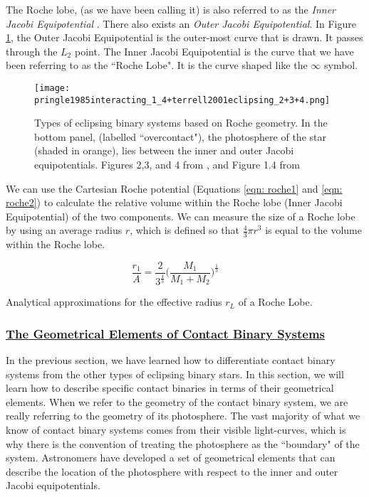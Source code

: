 \documentclass[12pt]{article} %
\numberwithin{equation}{section} %
\begin{document}
The Roche lobe, (as we have been calling it) is also referred to as the \emph{Inner Jacobi Equipotential} . There also exists an \emph{Outer Jacobi Equipotential}. In Figure \ref{fig: pringle1985interacting_1_4+terrell2001eclipsing_2+3+4}, the Outer Jacobi Equipotential is the outer-most curve that is drawn. It passes through the $L_{2}$ point. The Inner Jacobi Equipotential is the curve that we have been referring to as the ``Roche Lobe". It is the curve shaped like the $\infty$ symbol.

\begin{figure}[H]
\centering
\texttt{[image: pringle1985interacting\_1\_4+terrell2001eclipsing\_2+3+4.png]}
\caption{Types of eclipsing binary systems based on Roche geometry. In the bottom panel, (labelled ``overcontact"), the photosphere of the star (shaded in orange), lies between the inner and outer Jacobi equipotentials. Figures 2,3, and 4 from \citet{terrell2001eclipsing}, and Figure 1.4 from \citet{pringle1985interacting}}
\label{fig: pringle1985interacting_1_4+terrell2001eclipsing_2+3+4}
\end{figure}

We can use the Cartesian Roche potential (Equations \ref{eqn: roche1} and \ref{eqn: roche2}) to calculate the relative volume within the Roche lobe (Inner Jacobi Equipotential) of the two components. We can measure the size of a Roche lobe by using an average radius $r$, which is defined so that $\frac{4}{3} \pi r^{3}$ is equal to the volume within the Roche lobe.

\citet{paczynski1971evolutionary}

\begin{equation} \label{paczynski1971evolutionary_4}
\frac{r_{1}}{A} = \frac{2}{3^{\frac{4}{3}}} \Big( \frac{M_{1}}{M_{1} + M_{2}} \Big)^{\frac{1}{3}} \qquad 
\end{equation}

Analytical approximations for the effective radius $r_{L}$ of a Roche Lobe. \citet{eggleton1983approximation}

\subsubsection[The Geometrical Elements of Contact Binary Systems]{\hyperlink{toc}{The Geometrical Elements of Contact Binary Systems}} \label{sec: The Geometrical Elements of Contact Binary Systems}

In the previous section, we have learned how to differentiate contact binary systems from the other types of eclipsing binary stars. In this section, we will learn how to describe specific contact binaries in terms of their geometrical elements. When we refer to the geometry of the contact binary system, we are really referring to the geometry of its photosphere. The vast majority of what we know of contact binary systems comes from their visible light-curves, which is why there is the convention of treating the photosphere as the ``boundary" of the system. Astronomers have developed a set of geometrical elements that can describe the location of the photosphere with respect to the inner and outer Jacobi equipotentials. 
\end{document}
